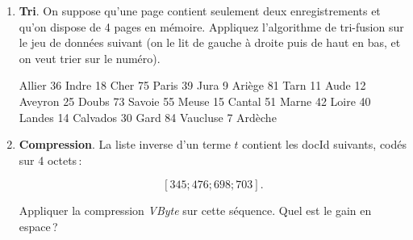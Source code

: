 \documentclass{article}
\newenvironment{smallverbatim}%
{\endgraf\small\verbatimtab}{\endverbatimtab}
\begin{document}
\begin{enumerate}
     
\section{Construction d'un index}


\item \textbf{Tri}. On suppose qu'une page contient seulement deux enregistrements et qu'on
   dispose de 4 pages en mémoire. Appliquez l'algorithme de tri-fusion sur le jeu de données 
      suivant (on le lit de gauche à droite puis de haut en bas, et on veut trier sur le numéro).

\begin{smallverbatim}
3 Allier  36 Indre   18 Cher   75 Paris    39 Jura
9 Ariège  81 Tarn    11 Aude   12 Aveyron  25 Doubs 
73 Savoie  55 Meuse   15 Cantal 51 Marne    42 Loire 
40 Landes 14 Calvados 30 Gard   84 Vaucluse 7 Ardèche
\end{smallverbatim}


\item \textbf{Compression}.
La liste inverse d'un terme $t$ contient les docId suivants, codés sur 4 octets\,:

\[[345; 476; 698; 703].\]

Appliquer la compression \textit{VByte} sur cette séquence. Quel est le gain en espace\,?

\end{enumerate}
\end{document}
